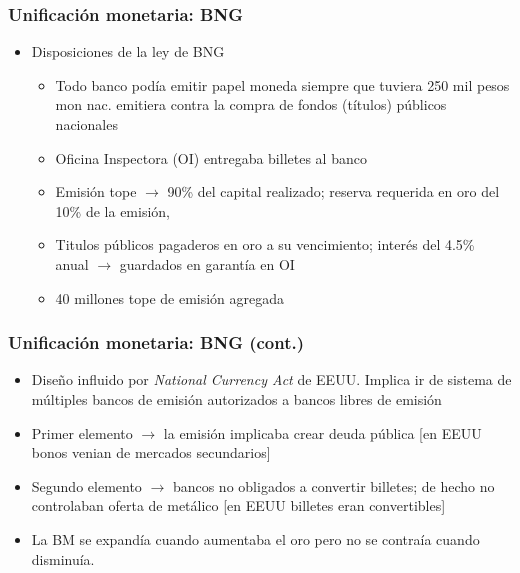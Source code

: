 \documentclass[14pt,aspectratio=169]{beamer}
\begin{document}
\begin{frame}\frametitle{Unificación monetaria: BNG}
     \begin{itemize}
     \item Disposiciones de la ley de BNG
       \begin{itemize}\itemsep 10pt \bigskip
         \item Todo banco podía emitir papel moneda siempre que
           tuviera 250 mil pesos mon nac. emitiera contra la compra de fondos (títulos) públicos nacionales
         \item Oficina Inspectora (OI) entregaba billetes al banco
           \item Emisión tope $\longrightarrow$ 90\% del capital
             realizado; reserva requerida en oro del 10\% de la emisión, 
             \item Titulos públicos pagaderos en oro a su vencimiento;
               interés del 4.5\% anual $\longrightarrow$ guardados en garantía en OI
               \item 40 millones tope de emisión agregada
               \end{itemize}
               \end{itemize}
        \end{frame}



        \begin{frame}\frametitle{Unificación monetaria: BNG (cont.)}
     \begin{itemize}
     \item Diseño influido por \textit{National Currency Act} de
       EEUU. Implica ir de sistema de múltiples bancos de emisión
       autorizados a bancos libres de emisión
       \item Primer elemento $\longrightarrow$ la emisión implicaba
         crear deuda pública [en EEUU bonos venian de mercados secundarios]
         \item Segundo elemento $\longrightarrow$ bancos no obligados
           a convertir billetes; de hecho no controlaban oferta de
           metálico [en EEUU billetes eran convertibles]
           \item La BM se expandía cuando aumentaba el oro pero no se
             contraía cuando disminuía. 
                \end{itemize}
        \end{frame}
\end{document}
